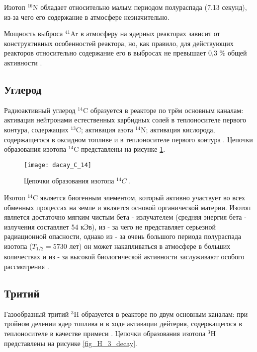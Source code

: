 Изотоп $^{16}\text{N}$ обладает относительно малым периодом полураспада (7.13 секунд), из-за чего его содержание в 
атмосфере незначительно. 

Мощность выброса $^{41}\text{Ar}$ в атмосферу на ядерных реакторах зависит от конструктивных особенностей реактора, но, 
как правило, для действующих реакторов относительно содержание его в выбросах не превышает 0,3 \% общей активности 
\cite{bekman_nuclear}.

\subsection{Углерод}

Радиоактивный углерод $^{14}\text{C}$ образуется в реакторе по трём основным каналам: активация нейтронами естественных 
карбидных солей в теплоносителе первого контура, содержащих $^{13}\text{C}$; активация азота $^{14}\text{N}$; активация 
кислорода, содержащегося в оксидном топливе и в теплоносителе первого контура \cite{bekman_nuclear}. Цепочки образования 
изотопа $^{14}\text{C}$ представлены на рисунке \ref{fig_C_14_decay}.

\begin{figure}[ht!]
    \centering
    \texttt{[image: dacay\_C\_14]}
    \captionsetup{justification=centering}
    \caption{Цепочки образования изотопа $^{14}C$ \cite{periodic_table}.}
    \label{fig_C_14_decay}
\end{figure}

Изотоп $^{14}\text{C}$ является биогенным элементом, который активно участвует во всех обменных процессах на земле и 
является основой органической материи. Изотоп является достаточно мягким чистым бета - излучателем (средняя энергия бета 
- излучения составляет 54 кЭв), из - за чего не представляет серьезной радиационной опасности, однако из - за очень 
большого периода полураспада изотопа ($T_{1/2}=5730$ лет) он может накапливаться в атмосфере в больших количествах и 
из - за высокой биологической активности заслуживают особого рассмотрения \cite{nuc_waste}.

\subsection{Тритий}

Газообразный тритий $^{3}\text{H}$ образуется в реакторе по двум основным каналам: при тройном делении ядер топлива и в 
ходе активации дейтерия, содержащегося в теплоносителе в качестве примеси \cite{bekman_nuclear}. Цепочки образования 
изотопа $^{3}\text{H}$ представлены на рисунке \ref{fig_H_3_decay}.

